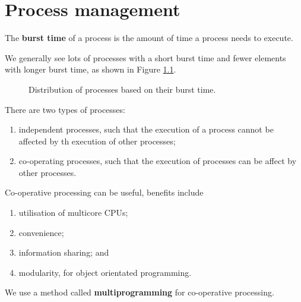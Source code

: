 \chapter{Process management}

\begin{definition}
    The \textbf{burst time} of a process is the amount of time a process needs to execute.
\end{definition}

We generally see lots of processes with a short burst time and fewer elements with longer burst time, as shown in Figure \ref{fig:burst_time_graph}.

\begin{figure}
    \centering
    \label{fig:burst_time_graph}
    \caption{Distribution of processes based on their burst time.}
\end{figure}

\begin{definition}
    There are two types of processes:
    \begin{enumerate}
        \item independent processes, such that the execution of a process cannot be affected by th execution of other processes;
        \item co-operating processes, such that the execution of processes can be affect by other processes.
    \end{enumerate}
\end{definition}

Co-operative processing can be useful, benefits include
\begin{enumerate}
    \item utilisation of multicore CPUs;
    \item convenience;
    \item information sharing; and
    \item modularity, for object orientated programming.
\end{enumerate}

We use a method called \textbf{multiprogramming} for co-operative processing.


